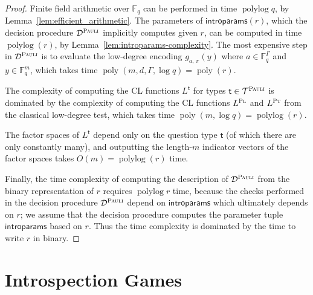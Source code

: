 \documentclass[11pt]{article}
\theoremstyle{definition}
\newcommand{\Id}{\ensuremath{I}}
\newcommand{\F}{\ensuremath{\mathbb{F}}}
\DeclareMathOperator{\poly}{poly}
\newcommand{\ia}{\Id_\alice}
\newcommand{\ib}{\Id_\bob}
\DeclareMathOperator{\polylog}{polylog}
\newcommand{\decider}{\mathcal{D}}
\newcommand{\type}{\mathcal{T}}
\newcommand{\gamestyle}[1]{\ensuremath{\textsc{#1}}\xspace}
\newcommand{\pauli}{\gamestyle{Pauli}}
\newcommand{\labelstyle}[1]{\ensuremath{\textsc{#1}}\xspace}
\newcommand{\plf}{\labelstyle{Pl}}
\newcommand{\ptf}{\labelstyle{Pt}}
\newcommand{\tvarstyle}[1]{\mathsf{#1}}
\newcommand{\tvar}{\ensuremath{\tvarstyle{t}}}
\newcommand{\alice}{\labelstyle{A}}
\newcommand{\bob}{\labelstyle{B}}
\newcommand{\typestyle}[1]{\ensuremath{\textsc{#1}}\xspace}
\newcommand{\Sample}{\typestyle{Sample}}
\newcommand{\Read}{\typestyle{Read}}
\newcommand{\Hide}[1]{\typestyle{Hide}_{#1}}
\newcommand{\Intro}{\typestyle{Intro}}
\newcommand{\introparams}{\mathsf{introparams}}
\begin{document}
\begin{proof}
	Finite field arithmetic over $\F_q$ can be performed in time $\polylog q$, by
  Lemma~\ref{lem:efficient_arithmetic}.
  The parameters of $\introparams(r)$, which the decision procedure
  $\decider^\pauli$ implicitly computes given $r$, can be computed in time
  $\polylog(r)$, by Lemma~\ref{lem:introparams-complexity}.
  The most expensive step in $\decider^\pauli$ is to evaluate the low-degree
  encoding $g_{a,\, \pi}(y)$ where $a \in \F_q^\Gamma$ and $y \in \F_q^m$, which
  takes time $\poly(m,d,\Gamma,\log q) = \poly(r)$.
	
  The complexity of computing the CL functions $L^\tvar$ for types $\tvar \in
  \type^\pauli$ is dominated by the complexity of computing the CL functions
  $L^\plf$ and $L^\ptf$ from the classical low-degree test, which takes time
  $\poly(m, \log q) = \polylog(r)$.

  The factor spaces of $L^\tvar$ depend only on the question type $\tvar$ (of
  which there are only constantly many), and outputting the length-$m$ indicator
  vectors of the factor spaces takes $O(m) = \polylog (r)$ time.

  Finally, the time complexity of computing the description of $\decider^\pauli$
  from the binary representation of $r$ requires $\polylog r$ time, because the
  checks performed in the decision procedure $\decider^\pauli$ depend on
  $\introparams$ which ultimately depends on $r$; we assume that the decision
  procedure computes the parameter tuple $\introparams$ based on $r$.
  Thus the time complexity is dominated by the time to write $r$ in binary.
\end{proof}

\section{Introspection Games}
\label{sec:introspection}

\newcommand{\ai}[1][y,\, a]{A^\Intro_{#1}}
\newcommand{\bs}[1][z,\, a]{B^\Sample_{#1}}
\newcommand{\br}[1][y,y^\perp, a]{B^\Read_{#1}}
\newcommand{\ahk}[1][y_{<k}]{A^{\Hide{k}}_{#1}}
\newcommand{\ahp}[1][y_{\le k}]{A^{\Hide{k+1}}_{#1}}
\newcommand{\bhk}[1][y_{<k}]{B^{\Hide{k}}_{#1}}
\newcommand{\bhp}[1][y_{\le k}]{B^{\Hide{k+1}}_{#1}}
\newcommand{\z}[1][z]{\sigma^Z_{#1}}
\newcommand{\x}[1][x]{\sigma^X_{#1}}
\end{document}
